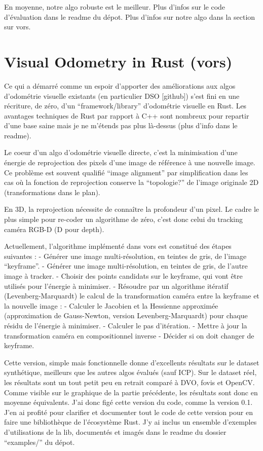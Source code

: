 En moyenne, notre algo robuste est le meilleur. Plus d’infos sur le code d’évaluation dans le readme du dépot. Plus d’infos sur notre algo dans la section sur vors.

\section{Visual Odometry in Rust (vors)}%
\label{sec:vors}

Ce qui a démarré comme un espoir d’apporter des améliorations aux algos d’odométrie visuelle existants (en particulier DSO [github]) s’est fini en une récriture, de zéro, d’un “framework/library” d’odométrie visuelle en Rust. Les avantages techniques de Rust par rapport à C++ sont nombreux pour repartir d’une base saine mais je ne m’étends pas plus là-dessus (plus d’info dans le readme).

Le coeur d’un algo d’odométrie visuelle directe, c’est la minimisation d’une énergie de reprojection des pixels d’une image de référence à une nouvelle image. Ce problème est souvent qualifié “image alignment” par simplification dans les cas où la fonction de reprojection conserve la “topologie?” de l’image originale 2D (transformations dans le plan).

En 3D, la reprojection nécessite de connaître la profondeur d’un pixel. Le cadre le plus simple pour re-coder un algorithme de zéro, c’est donc celui du tracking caméra RGB-D (D pour depth).

Actuellement, l’algorithme implémenté dans vors est constitué des étapes suivantes :
- Générer une image multi-résolution, en teintes de gris, de l’image “keyframe”.
- Générer une image multi-résolution, en teintes de gris, de l’autre image à tracker.
- Choisir des points candidats sur le keyframe, qui vont être utilisés pour l’énergie à minimiser.
- Résoudre par un algorithme itératif (Levenberg-Marquardt) le calcul de la transformation caméra entre la keyframe et la nouvelle image :
  - Calculer le Jacobien et la Hessienne approximée (approximation de Gauss-Newton, version Levenberg-Marquardt) pour chaque résidu de l’énergie à minimiser.
  - Calculer le pas d’itération.
  - Mettre à jour la transformation caméra en compositionnel inverse
- Décider si on doit changer de keyframe.

Cette version, simple mais fonctionnelle donne d’excellents résultats sur le dataset synthétique, meilleurs que les autres algos évalués (sauf ICP). Sur le dataset réel, les résultats sont un tout petit peu en retrait comparé à DVO, fovis et OpenCV. Comme visible sur le graphique de la partie précédente, les résultats sont donc en moyenne équivalents. J’ai donc figé cette version du code, comme la version 0.1. J’en ai profité pour clarifier et documenter tout le code de cette version pour en faire une bibliothèque de l’écosystème Rust. J’y ai inclus un ensemble d’exemples d’utilisations de la lib, documentés et imagés dans le readme du dossier “examples/” du dépot.

